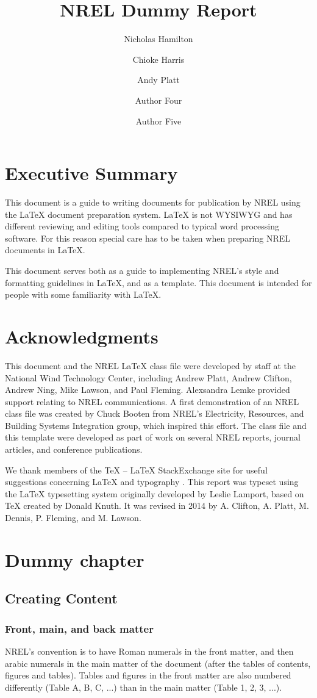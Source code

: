 \documentclass[]{nrel}
\title{NREL Dummy Report}
\author{Nicholas Hamilton}
\author{Chioke Harris}
\author{Andy Platt}
\affil{National Renewable Energy Laboratory}
\author{Author Four}
\affil{Another affiliation}
\author{Author Five}
\affil{A third affiliation}
\begin{document}
\frontmatter
\chapter{Executive Summary}
This document is a guide to writing documents for publication by NREL using the LaTeX document preparation system. LaTeX is not WYSIWYG and has different reviewing and editing tools compared to typical word processing software. For this reason special care has to be taken when preparing NREL documents in LaTeX. 

This document serves both as a guide to implementing NREL's style and formatting guidelines in LaTeX, and as a template. This document is intended for people with some familiarity with LaTeX.

\chapter{Acknowledgments}
This document and the NREL LaTeX class file were developed by staff at the National Wind Technology Center, including Andrew Platt, Andrew Clifton, Andrew Ning, Mike Lawson, and Paul Fleming. Alexsandra Lemke provided support relating to NREL communications. A first demonstration of an NREL class file was created by Chuck Booten from NREL's Electricity, Resources, and Building Systems Integration group, which inspired this effort. The class file and this template were developed as part of work on several NREL reports, journal articles, and conference publications. 

We thank members of the TeX -- LaTeX StackExchange site for useful suggestions concerning LaTeX and typography \citep{texstackexchange}.
This report was typeset using the LaTeX typesetting system originally developed by Leslie Lamport, based on TeX created by Donald Knuth. It was revised in 2014 by A. Clifton, A. Platt, M. Dennis, P. Fleming, and M. Lawson.


\mainmatter
\tableofcontents
\listoffigures
\listoftables


\chapter{Dummy chapter}
\section{Creating Content}
\subsection{Front, main, and back matter}
NREL's convention is to have Roman numerals in the front matter, and then arabic numerals in the main matter of the document (after the tables of contents, figures and tables). Tables and figures in the front matter are also numbered differently (Table A, B, C, ...) than in the main matter (Table 1, 2, 3, ...).
\end{document}
